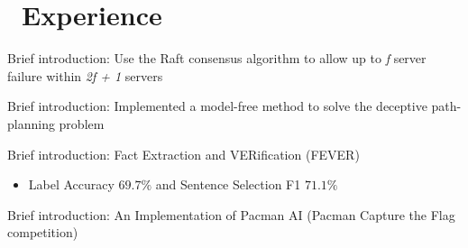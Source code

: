\documentclass{resume}
\begin{document}
\section{\faUsers\ Experience}

Brief introduction: Use the Raft consensus algorithm to allow up to \textit{f} server failure within \textit{2f + 1} servers




Brief introduction: Implemented a model-free method to solve the deceptive path-planning problem


Brief introduction: Fact Extraction and VERification (FEVER)
\begin{itemize}
  \item Label Accuracy $69.7\%$ and Sentence Selection F1 $71.1\%$
\end{itemize}


Brief introduction: An Implementation of Pacman AI (Pacman Capture the Flag competition)




\end{document}
